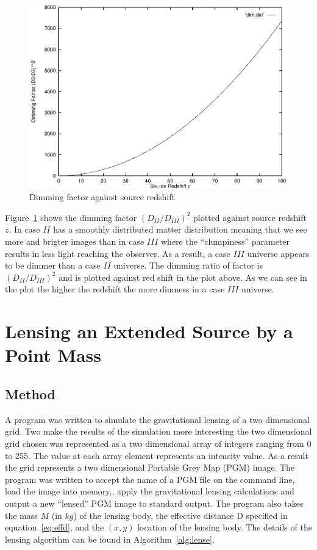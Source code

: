 \documentclass[a4paper]{IEEEtran}
\begin{document}
\begin{figure}
    \caption{Dimming factor against source redshift}
    \label{fig:dimming}
    \begin{center}
        \includegraphics[width=\columnwidth]{results/dim.eps}
    \end{center}
\end{figure}

Figure~\ref{fig:dimming} shows the dimming factor $(D_{II}/D_{III})^2$ plotted
against source redshift $z$. In case $II$ has a smoothly distributed
matter distribution meaning that we see more and brigter images than
in case $III$ where the ``clumpiness'' parameter results in less
light reaching the observer. As a result, a case $III$ universe appears
to be dimmer than a case $II$ universe. The dimming ratio of factor
is $(D_{II}/D_{III})^2$ and is plotted against red shift in the plot above.
As we can see in the plot the higher the redshift the more dimness in
a case $III$ universe.

\section{Lensing an Extended Source by a Point Mass}
    \subsection{Method}
    A program was written to simulate the gravitational lensing 
    of a two dimensional grid. Two make the results of the simulation
    more interesting the two dimensional grid chosen was represented
    as a two dimensional array of integers ranging from 0 to 255.
    The value at each array element represents an intensity value. As a result
    the grid represents a two dimensional Portable Grey Map (PGM) image.
    The program was written to accept the name of a PGM file on the command
    line, load the image into memory,, apply the gravitational lensing calculations
    and output a new ``lensed'' PGM image to standard output. The program
    also takes the mass $M$ (in $kg$) of the lensing body, the effective
    distance D specified in equation~\ref{eq:effd}, and the $(x,y)$
    location of the lensing body.
    The details of the lensing algorithm can be found in Algorithm~\ref{alg:lense}.
\end{document}
